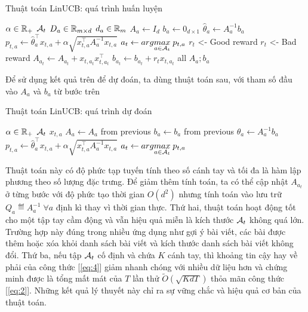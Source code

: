 \documentclass[14pt,oneside]{scrbook}
\begin{document}
\begin{algorithm}[H]
\caption{Thuật toán LinUCB: quá trình huấn luyện}
\begin{algorithmic}[1]
\Require $\alpha \in \mathbb{R}_+$
\Require $\mathcal{A}_t$
\Require $D_a \in \mathbb{R}_{m \times d}$
\Require $d_a \in \mathbb{R}_{m}$
    \State $A_a \leftarrow I_d$
    \State $b_a \leftarrow 0_{d \times 1}$
\EndFor
{}
            \State $\hat{\theta}_a \leftarrow A_a^{-1} b_a$
            \State $p_{t,a} \leftarrow \hat{\theta}_a^\top x_{t,a} + \alpha \sqrt{x_{t,a}^\top A_a^{-1} x_{t,a}}$
        \EndFor
        \State $a_t \leftarrow arg\underset{a\in\mathcal{A}_t}{max}\;p_{t,a}$
            \State $r_t$ <- Good reward 
        \Else
            \State $r_t$ <- Bad reward 
        \EndIf
        \State $A_{a_t} \leftarrow A_{a_t} + x_{t,a_t} x_{t,a_t}^\top$
        \State $b_{a_t} \leftarrow b_{a_t} + r_t x_{t,a_t}$
    \EndFor    
\EndFor
\State \Return all $A_a; b_a$
\end{algorithmic}
\end{algorithm}

Để sử dụng kết quả trên để dự đoán, ta dùng thuật toán sau, với tham số
đầu vào \(A_a\) và \(b_a\) từ bước trên

\begin{algorithm}[H]
\caption{Thuật toán LinUCB: quá trình dự đoán}
\begin{algorithmic}[1]
\Require $\alpha \in \mathbb{R}_+$
\Require $\mathcal{A}_t$
\Require $x_{t,a}$
    \State $A_a \leftarrow A_a $ from previous
    \State $b_a \leftarrow b_a $ from previous
\EndFor
{}
    \State $\hat{\theta}_a \leftarrow A_a^{-1} b_a$
    \State $p_{t,a} \leftarrow \hat{\theta}_a^\top x_{t,a} + \alpha \sqrt{x_{t,a}^\top A_a^{-1} x_{t,a}}$
\EndFor
\State \Return $a_t \leftarrow arg\underset{a\in\mathcal{A}_t}{max}\;p_{t,a}$
\end{algorithmic}
\end{algorithm}

Thuật toán này có độ phức tạp tuyến tính theo số cánh tay và tối đa là
hàm lập phương theo số lượng đặc trưng. Để giảm thêm tính toán, ta có
thể cập nhật \(A_{a_t}\) ở từng bước với độ phức tạo thời gian
\(O(d^2)\) nhưng tính toán vào lưu trữ \(Q_a\eqdef A^{-1}_a\;\forall a\)
định kì thay vì thời gian thực. Thứ hai, thuật toán hoạt động tốt cho
một tập tay cầm động và vẫn hiệu quả miễn là kích thước \(\mathcal{A}_t\) không
quá lớn. Trường hợp này đúng trong nhiều ứng dụng như gợi ý bài viết,
các bài được thêm hoặc xóa khỏi danh sách bài viết và kích thước danh
sách bài viết không đổi. Thứ ba, nếu tập \(\mathcal{A}_t\) cố định và chứa \(K\)
cánh tay, thì khoảng tin cậy hay về phải của công thức {[}\ref{eq:4}{]}
giảm nhanh chóng với nhiều dữ liệu hơn và chứng minh được là tổng mất
mát của \(T\) lần thử \(\tilde{O}\left(\sqrt{KdT}\right)\) thỏa mãn công
thức {[}\ref{eq:2}{]}. Những kết quả lý thuyết này chỉ ra sự vững chắc
và hiệu quả cơ bản của thuật toán.
\end{document}
